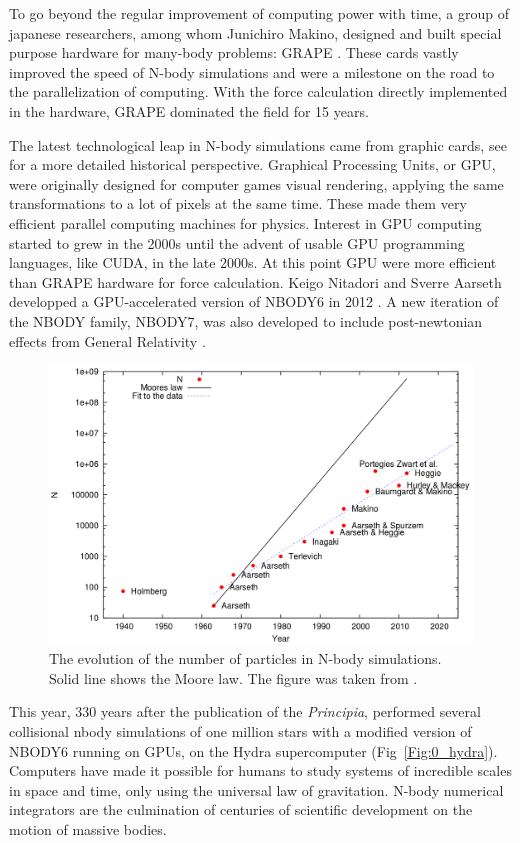 To go beyond the regular improvement of computing power with time, a group of japanese researchers, among whom Junichiro Makino, designed and built special purpose hardware for many-body problems: GRAPE \citep{Ebisuzaki1990,Ito1991}. These cards vastly improved the speed of N-body simulations and were a milestone on the road to the parallelization of computing. With the force calculation directly implemented in the hardware, GRAPE dominated the field for 15 years.

The latest technological leap in N-body simulations came from graphic cards, see \cite{Bedorf2012} for a more detailed historical perspective. Graphical Processing Units, or GPU, were originally designed for computer games visual rendering, applying the same transformations to a lot of pixels at the same time. These made them very efficient parallel computing machines for physics. Interest in GPU computing started to grew in the 2000s \citep{Nyland2004,Elsen2006,SPZ2007} until the advent of usable GPU programming languages, like CUDA, in the late 2000s. At this point GPU were more efficient than GRAPE hardware for force calculation. Keigo Nitadori and Sverre Aarseth developped a GPU-accelerated version of NBODY6 in 2012 \citep{Nitadori2012}. A new iteration of the NBODY family, NBODY7, was also developed to include post-newtonian effects from General Relativity \citep{Aarseth2012}.

\begin{figure}
\label{Fig:N_increase}
\includegraphics[width=0.9\linewidth]{Figures/0_N_increase.png}
\caption{The evolution of the number of particles in N-body simulations. Solid line shows the Moore law. The figure was taken from \protect\cite{Bedorf2012}. }
\end{figure}


This year, 330 years after the publication of the \textit{Principia}, \cite{Wang2016} performed several collisional nbody simulations of one million stars with a modified version of NBODY6 running on GPUs, on the Hydra supercomputer (Fig~\ref{Fig:0_hydra}). Computers have made it possible for humans to study systems of incredible scales in space and time, only using the universal law of gravitation. N-body numerical integrators are the culmination of centuries of scientific development on the motion of massive bodies.